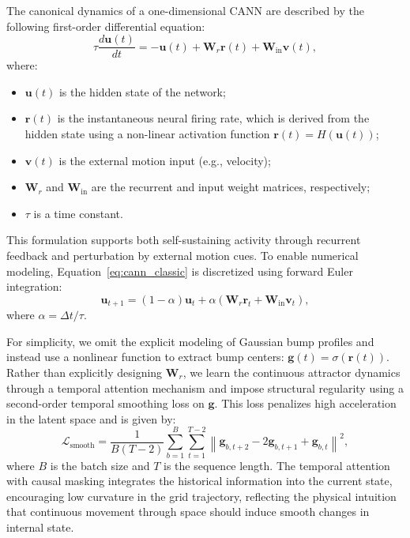 The canonical dynamics of a one-dimensional CANN are described by the following first-order differential equation:
\begin{equation} \label{eq:cann_classic}
\tau \frac{d\mathbf{u}(t)}{dt} = -\mathbf{u}(t) + \mathbf{W}_r \mathbf{r}(t) + \mathbf{W}_{\text{in}} \mathbf{v}(t),
\end{equation}
where:
\begin{itemize}
    \item $\mathbf{u}(t)$ is the hidden state of the network;
    \item $\mathbf{r}(t)$ is the instantaneous neural firing rate, which is derived from the hidden state using a non-linear activation function $\mathbf{r}(t)=H(\mathbf{u}(t))$;
    \item $\mathbf{v}(t)$ is the external motion input (e.g., velocity);
    \item $\mathbf{W}_r$ and $\mathbf{W}_{\text{in}}$ are the recurrent and input weight matrices, respectively;
    \item $\tau$ is a time constant.
\end{itemize}

This formulation supports both self-sustaining activity through recurrent feedback and perturbation by external motion cues.
To enable numerical modeling, Equation~\eqref{eq:cann_classic} is discretized using forward Euler integration:
\begin{equation} \label{eq:cann_discrete}
\mathbf{u}_{t+1} = (1 - \alpha)\mathbf{u}_t + \alpha \left( \mathbf{W}_r \mathbf{r}_t + \mathbf{W}_{\text{in}} \mathbf{v}_t \right),
\end{equation}
where $\alpha = \Delta t / \tau$.

For simplicity, we omit the explicit modeling of Gaussian bump profiles and instead use a nonlinear function to extract bump centers: $\mathbf{g}(t) = \sigma(\mathbf{r}(t))$. Rather than explicitly designing $\mathbf{W}_r$, we learn the continuous attractor dynamics through a temporal attention mechanism and impose structural regularity using a second-order temporal smoothing loss on $\mathbf{g}$. This loss penalizes high acceleration in the latent space and is given by:
\begin{equation} \label{eq:smooth_loss}
\mathcal{L}_{\text{smooth}} = \frac{1}{B(T - 2)} \sum_{b=1}^{B} \sum_{t=1}^{T-2} \left\| \mathbf{g}_{b,t+2} - 2\mathbf{g}_{b,t+1} + \mathbf{g}_{b,t} \right\|^2,
\end{equation}
where $B$ is the batch size and $T$ is the sequence length. The temporal attention with causal masking integrates the historical information into the current state, encouraging low curvature in the grid trajectory, reflecting the physical intuition that continuous movement through space should induce smooth changes in internal state. 

